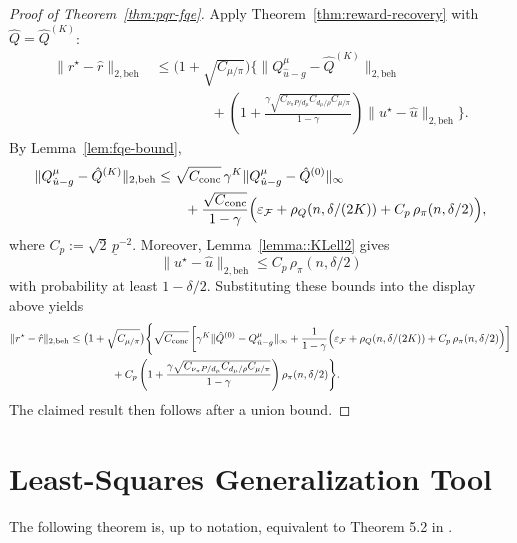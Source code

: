 \documentclass{article}
\newcommand{\1}{\mathbbm{1}}
\begin{document}
\begin{proof}[Proof of Theorem~\ref{thm:pqr-fqe}]
Apply Theorem~\ref{thm:reward-recovery} with \(\hat Q=\hat Q^{(K)}\):
\begin{align*}
\|r^\star-\hat r\|_{2,\mathrm{beh}}
&\le
\bigl(1+\sqrt{C_{\mu/\pi}}\bigr)
\Bigg\{
\|Q^\mu_{\hat u-g}-\hat Q^{(K)}\|_{2,\mathrm{beh}}\\
&\qquad\qquad+
\left(
1+\frac{\gamma\sqrt{C_{\nu_\pi P/d_\mu}C_{d_\mu/\rho}C_{\mu/\pi}}}{1-\gamma}
\right)
\|u^\star-\hat u\|_{2,\mathrm{beh}}
\Bigg\}.
\end{align*}
By Lemma~\ref{lem:fqe-bound},
\begin{align*}
\|Q^\mu_{\hat u-g}-\hat Q^{(K)}\|_{2,\mathrm{beh}}
&\le
\sqrt{C_{\mathrm{conc}}}\,\gamma^K
\|Q^\mu_{\hat u-g}-\hat Q^{(0)}\|_{\infty}\\
&\qquad+
\frac{\sqrt{C_{\mathrm{conc}}}}{1-\gamma}
\Bigl(
\varepsilon_{\mathcal F}
+\rho_Q(n,\delta/(2K))
+ C_p\,\rho_\pi(n,\delta/2)
\Bigr),
\end{align*}
where \(C_p:=\sqrt{2}\,\underline p^{-2}\). Moreover,
Lemma~\ref{lemma::KLell2} gives
\[
\|u^\star-\hat u\|_{2,\mathrm{beh}}
\le
C_p\,\rho_\pi(n,\delta/2)
\]
with probability at least \(1-\delta/2\). Substituting these bounds into the
display above yields
\begin{align*}
\|r^\star-\hat r\|_{2,\mathrm{beh}}
&\le
\bigl(1+\sqrt{C_{\mu/\pi}}\bigr)
\Bigg\{
\sqrt{C_{\mathrm{conc}}}
\left[
\gamma^K \|\hat Q^{(0)}-Q^\mu_{\hat u-g}\|_{\infty}
+
\frac{1}{1-\gamma}
\Bigl(
\varepsilon_{\mathcal F}
+\rho_Q(n,\delta/(2K))
+C_p\,\rho_\pi(n,\delta/2)
\Bigr)
\right]\\
&\qquad\qquad+
C_p\left(
1
+\frac{\gamma\sqrt{C_{\nu_\pi P/d_{\mu}}C_{d_\mu/\rho}C_{\mu/\pi}}}{1-\gamma}
\right)
\rho_\pi(n,\delta/2)
\Bigg\}.
\end{align*}
The claimed result then follows after a union bound.
\end{proof}

\section{Least-Squares Generalization Tool}
\label{appendix::LSE}

The following theorem is, up to notation, equivalent to Theorem 5.2 in
\cite{koltchinskii2011oracle}.
\end{document}
